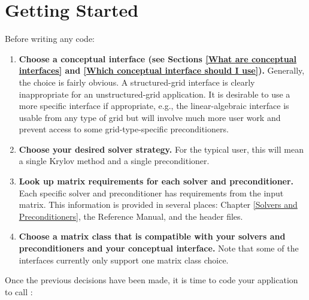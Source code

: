 

\chapter{Getting Started}
\label{Getting Started}

Before writing any code:

\begin{enumerate}

\item
{\bf Choose a conceptual interface (see Sections
\ref{What are conceptual interfaces} and
\ref{Which conceptual interface should I use}).}
Generally, the choice is fairly obvious.  A structured-grid interface
is clearly inappropriate for an unstructured-grid application.  It is
desirable to use a more specific interface if appropriate, e.g., the
linear-algebraic interface is usable from any type of grid but will
involve much more user work and prevent access to some
grid-type-specific preconditioners.

\item 
{\bf Choose your desired solver strategy.}  For the typical user, this
will mean a single Krylov method and a single preconditioner.

\item 
{\bf Look up matrix requirements for each solver and preconditioner.}
Each specific solver and preconditioner has requirements from the
input matrix.  This information is provided in several places: Chapter
\ref{Solvers and Preconditioners}, the \hypre{} Reference Manual, and
the \hypre{} header files.

\item 
{\bf Choose a matrix class that is compatible with your solvers and
preconditioners and your conceptual interface.}  Note that some of the
interfaces currently only support one matrix class choice.

\end{enumerate}
Once the previous decisions have been made, it is time to code your
application to call \hypre{}:
